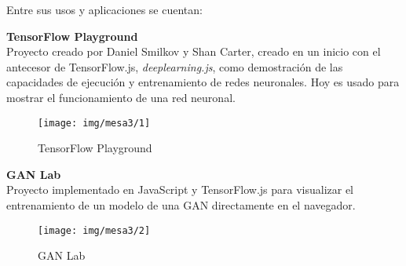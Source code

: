 Entre sus usos y aplicaciones se cuentan:


\textbf{TensorFlow Playground} \cite{TensorflowPlayground2020} \\
Proyecto creado por Daniel Smilkov y Shan Carter, creado en un inicio con el antecesor de TensorFlow.js, \emph{deeplearning.js}, como demostración de las capacidades de ejecución y entrenamiento de redes neuronales. Hoy es usado para mostrar el funcionamiento de una red neuronal.
\begin{figure}[H]
    \texttt{[image: img/mesa3/1]}
    \centering
    \caption{TensorFlow Playground}
\end{figure}

\textbf{GAN Lab} \cite{kahngGANLabUnderstanding2018}\\
Proyecto implementado en JavaScript y TensorFlow.js para visualizar el entrenamiento de un modelo de una GAN directamente en el navegador.
\begin{figure}[H]
    \texttt{[image: img/mesa3/2]}
    \centering
    \caption{GAN Lab}
\end{figure}
